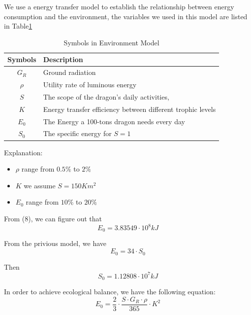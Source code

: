 \documentclass{mcmthesis}
\begin{document}
We use a energy transfer model to establish the relationship between energy consumption and the environment, the variables we used in this model are listed in Table\ref{tb:Variables5}


\begin{table}[h]
\centering
\caption{Symbols in Environment Model}
\begin{tabular}{cl}
\toprule
\textbf{Symbols}   & \textbf{Description}                                         \\
\midrule
$G_{R}$            & Ground radiation                                             \\
$\rho$             & Utility rate of luminous energy                             \\
$S$                & The scope of the dragon's daily activities,                  \\
$K$                & Energy transfer efficiency between different trophic levels  \\
$E_{0}$            & The Energy a 100-tons dragon needs every day                 \\
$S_{0}$            & The specific energy for $S=1$                                \\
\bottomrule
\end{tabular}\label{tb:Variables5}
\end{table}
Explanation:
\begin{itemize}
\item $\rho$ range from $0.5\%$ to $2\%$
\item $K$ we assume $S=150Km^{2}$
\item $E_{0}$ range from $10\%$ to $20\%$
\end{itemize}

From (8), we can figure out that
\begin{equation}
    E_{0}=3.83549\cdot 10^{8}kJ
\end{equation}

From the privious model, we have
\begin{equation}
    E_{0}=34\cdot S_{0}
\end{equation}

Then
\begin{equation}
    S_{0}=1.12808\cdot 10^{7}kJ
\end{equation}

In order to achieve ecological balance, we have the following equation:
\begin{equation}
    E_{0}=\frac{2}{3}\cdot \frac{S\cdot G_{R}\cdot \rho}{365}\cdot K^{2}
\end{equation}
\end{document}
